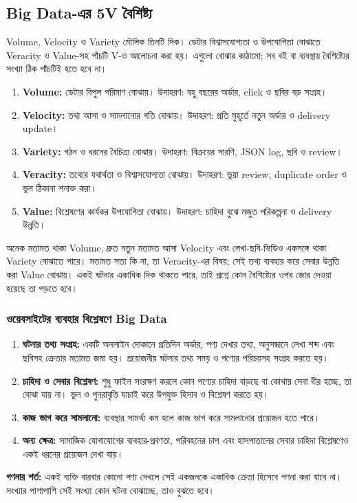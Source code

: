 \subsection{Big Data-এর 5V বৈশিষ্ট্য}
Volume, Velocity ও Variety মৌলিক তিনটি দিক। ডেটার বিশ্বাসযোগ্যতা ও উপযোগিতা বোঝাতে Veracity ও Value-সহ পাঁচটি V-ও আলোচনা করা হয়। এগুলো বোঝার কাঠামো; সব বই বা ব্যবস্থায় বৈশিষ্ট্যের সংখ্যা ঠিক পাঁচটিই হতে হবে না।
\begin{enumerate}
\item \textbf{Volume:} ডেটার বিপুল পরিমাণ বোঝায়। উদাহরণ: বহু বছরের অর্ডার, click ও ছবির বড় সংগ্রহ।
\item \textbf{Velocity:} তথ্য আসা ও সামলানোর গতি বোঝায়। উদাহরণ: প্রতি মুহূর্তে নতুন অর্ডার ও delivery update।
\item \textbf{Variety:} গঠন ও ধরনের বৈচিত্র্য বোঝায়। উদাহরণ: বিক্রয়ের সারণি, JSON log, ছবি ও review।
\item \textbf{Veracity:} তথ্যের যথার্থতা ও বিশ্বাসযোগ্যতা বোঝায়। উদাহরণ: ভুয়া review, duplicate order ও ভুল ঠিকানা শনাক্ত করা।
\item \textbf{Value:} বিশ্লেষণের কার্যকর উপযোগিতা বোঝায়। উদাহরণ: চাহিদা বুঝে মজুত পরিকল্পনা ও delivery উন্নতি।
\end{enumerate}
অনেক মতামত থাকা Volume, দ্রুত নতুন মতামত আসা Velocity এবং লেখা-ছবি-ভিডিও একসঙ্গে থাকা Variety বোঝাতে পারে। মতামত সত্য কি না, তা Veracity-এর বিষয়; সেই তথ্য ব্যবহার করে সেবার উন্নতি করা Value বোঝায়। একই ঘটনার একাধিক দিক থাকতে পারে, তাই প্রশ্নে কোন বৈশিষ্ট্যের ওপর জোর দেওয়া হয়েছে তা পড়তে হবে।


\subsubsection{ওয়েবসাইটের ব্যবহার বিশ্লেষণে Big Data}
\begin{enumerate}
\item \textbf{ঘটনার তথ্য সংগ্রহ:} একটি অনলাইন দোকানে প্রতিদিন অর্ডার, পণ্য দেখার তথ্য, অনুসন্ধানে লেখা শব্দ এবং ছবিসহ ক্রেতার মতামত জমা হয়। প্রয়োজনীয় ঘটনার তথ্য সময় ও পণ্যের পরিচয়সহ সংগ্রহ করতে হয়।
\item \textbf{চাহিদা ও সেবার বিশ্লেষণ:} শুধু ফাইল সংরক্ষণ করলে কোন পণ্যের চাহিদা বাড়ছে বা কোথায় সেবা ধীর হচ্ছে, তা বোঝা যায় না। ভুল ও পুনরাবৃত্তি যাচাই করে উপযুক্ত হিসাব ও বিশ্লেষণ করতে হয়।
\item \textbf{কাজ ভাগ করে সামলানো:} ব্যবস্থার সামর্থ্য কম হলে কাজ ভাগ করে সামলানোর প্রয়োজন হতে পারে।
\item \textbf{অন্য ক্ষেত্র:} সামাজিক যোগাযোগের ব্যবহার-প্রবণতা, পরিবহনের চাপ এবং হাসপাতালের সেবার চাহিদা বিশ্লেষণেও একই ধরনের প্রয়োজন দেখা যায়।
\end{enumerate}
\textbf{গণনার শর্ত:} একই ব্যক্তি বারবার কোনো পণ্য দেখলে সেই একজনকে একাধিক ক্রেতা হিসেবে গণনা করা যাবে না। সংখ্যার পাশাপাশি সেই সংখ্যা কোন ঘটনা বোঝাচ্ছে, তাও বুঝতে হবে।

